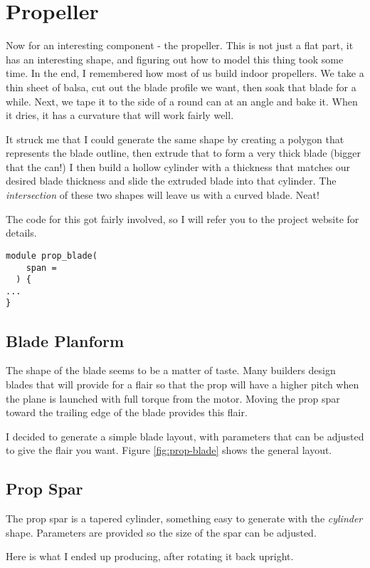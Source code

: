 \section{Propeller}

Now for an interesting component - the propeller. This is not just a flat part,
it has an interesting shape, and figuring out how to model this thing took some
time. In the end, I remembered how most of us build indoor propellers. We take a
thin sheet of balsa, cut out the blade profile we want, then soak that blade
for a while. Next, we tape it to the side of a round can at an angle and bake
it. When it dries, it has a curvature that will work fairly well.

It struck me that I could generate the same shape by creating a polygon that
represents the blade outline, then extrude that to form a very thick blade
(bigger that the can!) I then build a hollow cylinder with a thickness that
matches our desired blade thickness and slide the extruded blade into that cylinder.
The {\it intersection} of these two shapes will leave us with a curved blade.
Neat!

The code for this got fairly involved, so I will refer you to the project
website for details.

\begin{lstlisting}
module prop_blade(
	span =
  ) {
...
}
\end{lstlisting}

\subsection{Blade Planform}

The shape of the blade seems to be a matter of taste. Many builders design
blades that will provide for a flair so that the prop will have a higher pitch
when the plane is launched with full torque from the motor. Moving the prop
spar toward the trailing edge of the blade provides this flair.

I decided to generate a simple blade layout, with parameters that can be
adjusted to give the flair you want. Figure \ref{fig:prop-blade} shows the
general layout.


\subsection{Prop Spar}

The prop spar is a tapered cylinder, something easy to generate with the {\it
cylinder} shape. Parameters are provided so the size of the spar can be
adjusted.

Here is what I ended up producing, after rotating it back upright.



